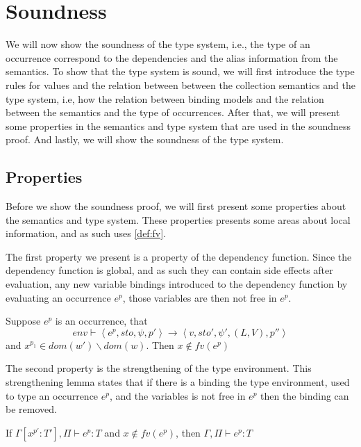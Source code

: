 \documentclass[../../master.tex]{subfiles}
\begin{document}
\section{Soundness}
We will now show the soundness of the type system, i.e., the type of an occurrence correspond to the dependencies and the alias information from the semantics.
To show that the type system is sound, we will first introduce the type rules for values and the relation between between the collection semantics and the type system, i.e, how the relation between binding models and the relation between the semantics and the type of occurrences.
After that, we will present some properties in the semantics and type system that are used in the soundness proof.
And lastly, we will show the soundness of the type system.




\subsection{Properties}
Before we show the soundness proof, we will first present some properties about the semantics and type system.
These properties presents some areas about local information, and as such uses \cref{def:fv}.

The first property we present is a property of the dependency function.
Since the dependency function is global, and as such they can contain side effects after evaluation, 
any new variable bindings introduced to the dependency function by evaluating an occurrence $e^p$, those variables are then not free in $e^p$.

\begin{lemma}[History]\label{lemma:His}
	Suppose $e^p$ is an occurrence, that
	$$env\vdash\left\langle e^{p},sto,\psi,p'\right\rangle\rightarrow\left\langle v,sto',\psi',(L,V),p''\right\rangle$$
		and $x^{p_1}\in dom(w')\backslash dom(w)$.
		Then $x\notin fv(e^{p})$
\end{lemma}


The second property is the strengthening of the type environment.
This strengthening lemma states that if there is a binding the type environment, used to type an occurrence $e^p$, and the variables is not free in $e^p$ then the binding can be removed.

\begin{lemma}[Strengthening]\label{lemma:Strength}
	If $\Gamma[x^{p'}:T'],\Pi\vdash e^{p}:T$ and $x\notin fv(e^p)$, then $\Gamma,\Pi\vdash e^{p}:T$
\end{lemma}

\end{document}
